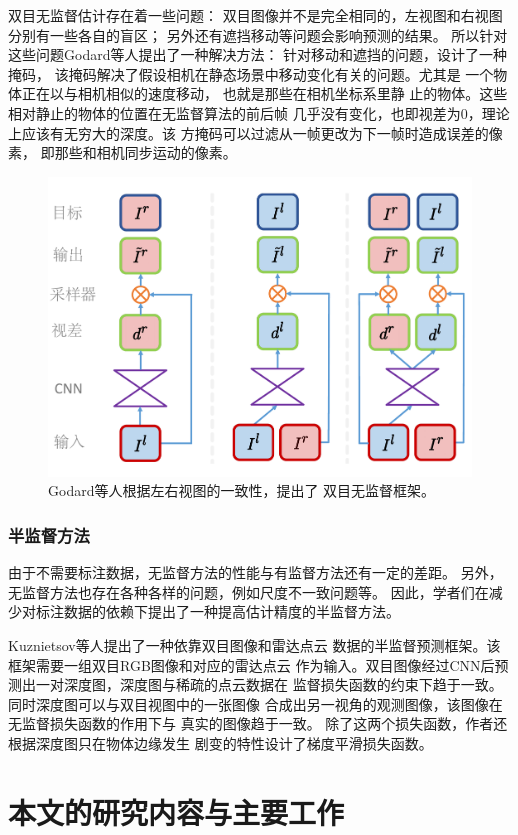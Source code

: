 双目无监督估计\cite{garg2016unsupervised}存在着一些问题：
双目图像并不是完全相同的，左视图和右视图分别有一些各自的盲区；
另外还有遮挡移动等问题会影响预测的结果。
所以针对这些问题Godard等人\cite{Godard2019}提出了一种解决方法：
针对移动和遮挡的问题，设计了一种掩码，
该掩码解决了假设相机在静态场景中移动变化有关的问题。尤其是
一个物体正在以与相机相似的速度移动，
也就是那些在相机坐标系里静
止的物体。这些相对静止的物体的位置在无监督算法的前后帧
几乎没有变化，也即视差为0，理论上应该有无穷大的深度。该
方掩码可以过滤从一帧更改为下一帧时造成误差的像素，
即那些和相机同步运动的像素。
\begin{figure}[tbp]
    \centering
    \includegraphics[width=0.7\linewidth]{figure/lr.pdf}
    \caption{Godard等人\cite{Godard2019}根据左右视图的一致性，提出了
    双目无监督框架。}
    \label{Sfm}
\end{figure}
\subsubsection{半监督方法}
由于不需要标注数据，无监督方法的性能与有监督方法还有一定的差距。
另外，无监督方法也存在各种各样的问题，例如尺度不一致问题等。
因此，学者们在减少对标注数据的依赖下提出了一种提高估计精度的半监督方法。

Kuznietsov等人\cite{kuznietsov}提出了一种依靠双目图像和雷达点云
数据的半监督预测框架。该框架需要一组双目RGB图像和对应的雷达点云
作为输入。双目图像经过CNN后预测出一对深度图，深度图与稀疏的点云数据在
监督损失函数的约束下趋于一致。同时深度图可以与双目视图中的一张图像
合成出另一视角的观测图像，该图像在无监督损失函数的作用下与
真实的图像趋于一致。
除了这两个损失函数，作者还根据深度图只在物体边缘发生
剧变的特性设计了梯度平滑损失函数。

\section{本文的研究内容与主要工作}

